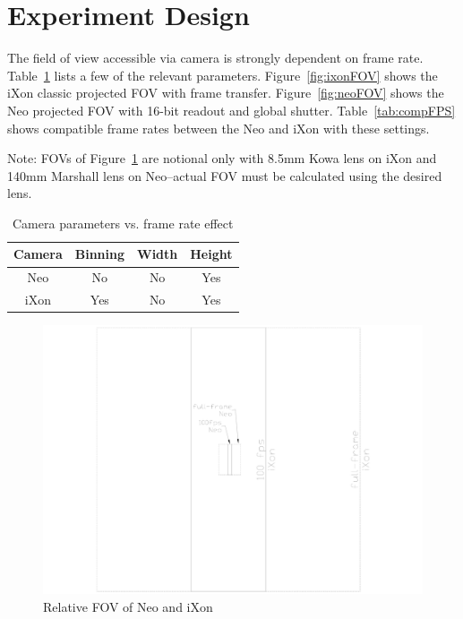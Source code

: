 \section{Experiment Design}\label{sec:ExpDes}
The field of view accessible via camera is strongly dependent on frame rate. 
Table~\ref{tab:camParamSpeed} lists a few of the relevant parameters. 
Figure~\ref{fig:ixonFOV} shows the iXon classic projected FOV with frame transfer. 
Figure~\ref{fig:neoFOV} shows the Neo projected FOV with 16-bit readout and global shutter.
Table~\ref{tab:compFPS} shows compatible frame rates between the Neo and iXon with these settings.

Note: FOVs of Figure~\ref{fig:overviewFOV} are notional only with 8.5mm Kowa lens on iXon and 140mm Marshall lens on Neo--actual FOV must be calculated using the desired lens.

\begin{table}\centering
\caption{Camera parameters vs. frame rate effect}
\label{tab:camParamSpeed}
    \begin{tabular}{cccc}
        \toprule
        Camera & Binning & Width & Height\\
        \midrule
        Neo & No & No & Yes\\
        iXon & Yes & No & Yes\\
        \bottomrule
    \end{tabular}
\end{table}
\begin{figure}    \centering
    \includegraphics[trim=300 10 300 10,clip,width=\textwidth]{gfx/FOV}
    \caption{Relative FOV of Neo and iXon}\label{fig:overviewFOV}
\end{figure}
